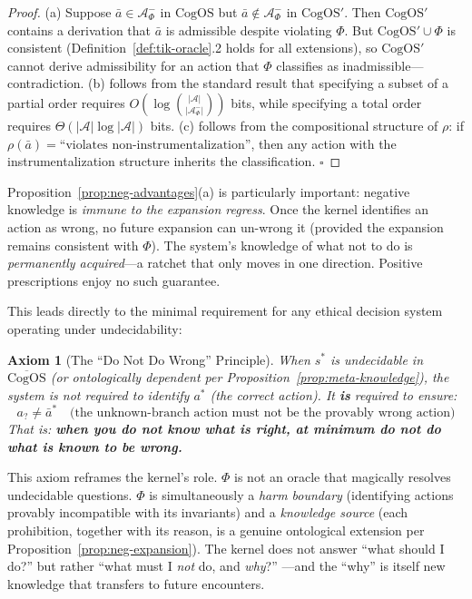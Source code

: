 \documentclass[11pt]{article}
\newtheorem{axiom}{Axiom}
\newcommand{\CogOS}{\text{CogOS}}
\begin{document}
\begin{proof}
(a) Suppose $\bar{a} \in \mathcal{A}^-_\Phi$ in $\CogOS$ but
$\bar{a} \notin \mathcal{A}^-_\Phi$ in $\CogOS'$. Then $\CogOS'$ contains a
derivation that $\bar{a}$ is admissible despite violating $\Phi$. But
$\CogOS' \cup \Phi$ is consistent (Definition~\ref{def:tik-oracle}.2 holds
for all extensions), so $\CogOS'$ cannot derive admissibility for an action
that $\Phi$ classifies as inadmissible---contradiction. (b) follows from the
standard result that specifying a subset of a partial order requires
$O(\log \binom{|\mathcal{A}|}{|\mathcal{A}^-_\Phi|})$ bits, while specifying
a total order requires $\Theta(|\mathcal{A}| \log |\mathcal{A}|)$ bits.
(c) follows from the compositional structure of $\rho$: if
$\rho(\bar{a}) = \text{``violates non-instrumentalization''}$, then any
action with the instrumentalization structure inherits the classification.
\hfill $\square$
\end{proof}

\noindent Proposition~\ref{prop:neg-advantages}(a) is particularly important:
negative knowledge is \textit{immune to the expansion regress}. Once the
kernel identifies an action as wrong, no future expansion can un-wrong it
(provided the expansion remains consistent with $\Phi$). The system's
knowledge of what not to do is \textit{permanently acquired}---a ratchet that
only moves in one direction. Positive prescriptions enjoy no such guarantee.

This leads directly to the minimal requirement for any ethical decision system
operating under undecidability:

\begin{axiom}[The ``Do Not Do Wrong'' Principle]
\label{ax:do-no-wrong}
When $s^*$ is undecidable in $\overline{\CogOS}$ (or ontologically dependent
per Proposition~\ref{prop:meta-knowledge}), the system is not required to
identify $a^*$ (the correct action). It \textbf{is} required to ensure:
\begin{equation}
a_? \neq \bar{a}^* \quad
\text{(the unknown-branch action must not be the provably wrong action)}
\end{equation}
That is: \textbf{when you do not know what is right, at minimum do not do
what is known to be wrong.}
\end{axiom}

\noindent This axiom reframes the kernel's role. $\Phi$ is not an oracle that
magically resolves undecidable questions. $\Phi$ is simultaneously a
\textit{harm boundary} (identifying actions provably incompatible with its
invariants) and a \textit{knowledge source} (each prohibition, together with
its reason, is a genuine ontological extension per
Proposition~\ref{prop:neg-expansion}). The kernel does not answer ``what
should I do?'' but rather ``what must I \textit{not} do, and \textit{why}?''
---and the ``why'' is itself new knowledge that transfers to future encounters.
\end{document}
